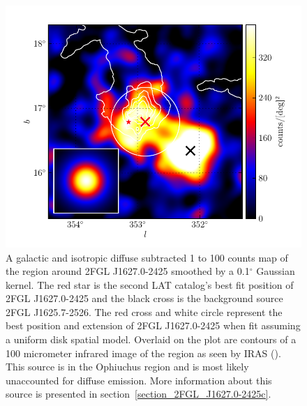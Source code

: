 \documentclass[12pt,preprint]{aastex}
\newcommand{\gev}{\text{GeV}\xspace}
\renewcommand{\deg}{\ensuremath{^\circ}\xspace}
\begin{document}
\begin{figure}
  \begin{center}
    \includegraphics[type=pdf,ext=.pdf,read=.pdf]{source_plots/source_1FGL_J1628.6-2419c}
  \end{center}
  \caption{
  A galactic and isotropic diffuse subtracted 1 \gev to 100 \gev counts map of the region around
  2FGL J1627.0-2425 smoothed by a 0.1\deg Gaussian kernel.  The red star
  is the second LAT catalog's best fit position of 2FGL J1627.0-2425 and
  the black cross is the background source 2FGL J1625.7-2526.  The red
  cross and white circle represent the best position and extension of
  2FGL J1627.0-2425 when fit assuming a uniform disk spatial model.
  Overlaid on the plot are contours of a 100 micrometer infrared
  image of the region as seen by IRAS (\cite{iras_rho_ophiuci}). This
  source is in the Ophiuchus region and is most likely unaccounted for
  diffuse emission.  More information about this source is presented
  in section~\ref{section_2FGL_J1627.0-2425c}.
  }\label{1FGL_J1628.6-2419c}
\end{figure}
\end{document}
